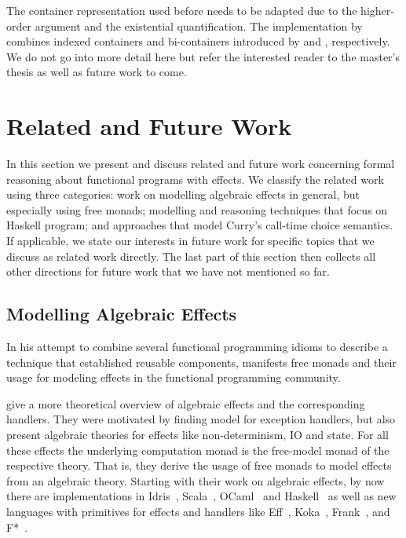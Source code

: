 The container representation used before needs to be adapted due to
the higher-order argument and the existential quantification.
The implementation by \citeauthor{bunkenburg2019modeling} combines
indexed containers and bi-containers introduced by
\citet{altenkirch2015indexed} and \citet{ghani2007higher}, respectively.
We do not go into more detail here but refer the interested reader to
the master's thesis as well as future work to come.

\section{Related and Future Work}

In this section we present and discuss related and future work
concerning formal reasoning about functional programs with effects.
We classify the related work using three categories: work on modelling
algebraic effects in general, but especially using free monads;
modelling and reasoning techniques that focus on Haskell program; and
approaches that model Curry's call-time choice semantics.
If applicable, we state our interests in future work for specific
topics that we discuss as related work directly.
The last part of this section then collects all other directions for
future work that we have not mentioned so far.

\subsection{Modelling Algebraic Effects}

In his attempt to combine several functional programming idioms to
describe a technique that established reusable components,
\citet{swierstra2008data} manifests free monads and their usage for
modeling effects in the functional programming community.

\citet{plotkin2009handlers} give a more theoretical overview of algebraic
effects and the corresponding handlers.
They were motivated by finding model for exception handlers, but also
present algebraic theories for effects like non-determinism, IO and
state.
For all these effects the underlying computation monad is the free-model
monad of the respective theory.
That is, they derive the usage of free monads to model effects from an
algebraic theory.
Starting with their work on algebraic effects, by now there are
implementations in Idris~\citep{brady2013programming},
Scala~\citep{brachthauser2017effekt}, OCaml~\citep{kiselyov2018eff}
and Haskell~\citep{kiselyov2015freer,kammar2013handlers} as well as
new languages with primitives for effects and handlers like
Eff~\citep{pretnar2015introduction}, Koka~\citep{leijen2016algebraic},
Frank~\citep{lindley2017be}, and F*~\citep{swamy2016dependent}.

